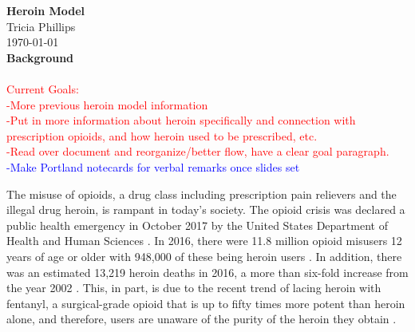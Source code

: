 \documentclass[12pt]{article}
\begin{document}
\textbf{Heroin Model} \\
Tricia Phillips \\
\today \\

\textbf{Background} \\ \\
\textcolor{red}{Current Goals:} \\ 
\textcolor{red}{-More previous heroin model information} \\ 
\textcolor{red}{-Put in more information about heroin specifically and connection with prescription opioids, and how heroin used to be prescribed, etc.} \\ 
\textcolor{red} {-Read over document and reorganize/better flow, have a clear goal paragraph.} \\ 
\textcolor{blue}{-Make Portland notecards for verbal remarks once slides set}


The misuse of opioids, a drug class including prescription pain relievers and the illegal drug heroin, is rampant in today's society. The opioid crisis was declared a public health emergency in October 2017 by the United States Department of Health and Human Sciences \cite{HHS1}. In 2016, there were 11.8 million opioid misusers 12 years of age or older with 948,000 of these being heroin users \cite{CDC2}. In addition, there was an estimated 13,219 heroin deaths in 2016, a more than six-fold increase from the year 2002 \cite{NSDUH1}. This, in part, is due to the recent trend of lacing heroin with fentanyl, a surgical-grade opioid that is up to fifty times more potent than heroin alone, and therefore, users are unaware of the purity of the heroin they obtain \cite{CDC1} \cite{Volkow}. 
\end{document}
